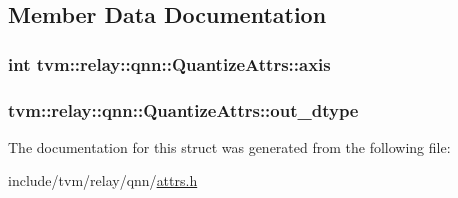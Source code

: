 \subsection{Member Data Documentation}
\subsubsection[{\texorpdfstring{axis}{axis}}]{\setlength{\rightskip}{0pt plus 5cm}int tvm\+::relay\+::qnn\+::\+Quantize\+Attrs\+::axis}\hypertarget{structtvm_1_1relay_1_1qnn_1_1QuantizeAttrs_a59eb1cf9ac723b0f03512c5ba16f1c8b}{}\label{structtvm_1_1relay_1_1qnn_1_1QuantizeAttrs_a59eb1cf9ac723b0f03512c5ba16f1c8b}
\subsubsection[{\texorpdfstring{out\+\_\+dtype}{out_dtype}}]{ tvm\+::relay\+::qnn\+::\+Quantize\+Attrs\+::out\+\_\+dtype}\hypertarget{structtvm_1_1relay_1_1qnn_1_1QuantizeAttrs_a556d06b77c7d1ce777b0cd91658872f8}{}\label{structtvm_1_1relay_1_1qnn_1_1QuantizeAttrs_a556d06b77c7d1ce777b0cd91658872f8}


The documentation for this struct was generated from the following file\+:\begin{DoxyCompactItemize}
\item 
include/tvm/relay/qnn/\hyperlink{relay_2qnn_2attrs_8h}{attrs.\+h}\end{DoxyCompactItemize}
